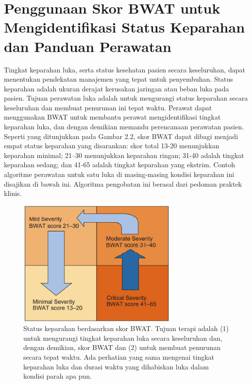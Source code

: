 \section{Penggunaan Skor BWAT untuk Mengidentifikasi Status Keparahan dan Panduan Perawatan}

Tingkat keparahan luka, serta status kesehatan pasien secara keseluruhan, dapat menentukan pendekatan manajemen yang tepat untuk penyembuhan. Status keparahan adalah ukuran derajat kerusakan jaringan atau beban luka pada pasien. Tujuan perawatan luka adalah untuk mengurangi status keparahan secara keseluruhan dan membuat penurunan ini tepat waktu. Perawat dapat menggunakan BWAT untuk membantu perawat mengidentifikasi tingkat keparahan luka, dan dengan demikian memandu perencanaan perawatan pasien.
Seperti yang ditunjukkan pada Gambar 2.2, skor BWAT dapat dibagi menjadi empat status keparahan yang disarankan: skor total 13-20 menunjukkan keparahan minimal; 21–30 menunjukkan keparahan ringan; 31-40 adalah tingkat keparahan sedang; dan 41-65 adalah tingkat keparahan yang ekstrim. Contoh algoritme perawatan untuk satu luka di masing-masing kondisi keparahan ini disajikan di bawah ini. Algoritma pengobatan ini berasal dari pedoman praktek klinis.
\begin{figure}[H]
	\centering
	\includegraphics[keepaspectratio, width=8cm]{gambar/skor_tingkat_keparahan}
	\caption{Status keparahan berdasarkan skor BWAT. Tujuan terapi adalah (1) untuk mengurangi tingkat keparahan luka secara keseluruhan dan, dengan demikian, skor BWAT dan (2) untuk membuat penurunan secara tepat waktu. Ada perhatian yang sama mengenai tingkat keparahan luka dan durasi waktu yang dihabiskan luka dalam kondisi parah apa pun. \citep{sussman2012}}
	\label{gambar:skor_tingkat_keparahan_bwat}
\end{figure}
